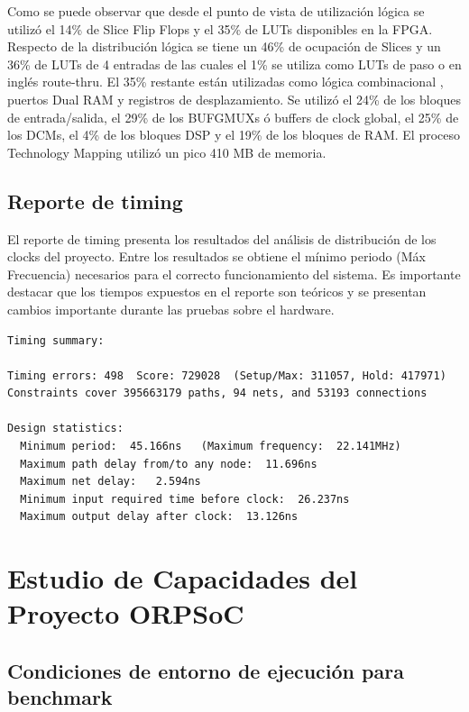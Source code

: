 	Como se puede observar que desde el punto de vista de utilización lógica se utilizó el 14\% de Slice Flip Flops y el 35\% de LUTs disponibles en
	la FPGA. Respecto de la distribución lógica se tiene un 46\% de ocupación de Slices y un 36\% de LUTs de 4 entradas de las cuales el 1\% se utiliza
	como LUTs de paso o en inglés route-thru. El 35\% restante están utilizadas como lógica combinacional , puertos Dual RAM y registros de
	desplazamiento. Se utilizó el 24\% de los bloques de entrada/salida, el 29\% de los BUFGMUXs ó buffers de clock global, el 25\% de los DCMs, el 4\%
	de los bloques DSP y el 19\% de los bloques de RAM. El proceso Technology Mapping utilizó un pico 410 MB de memoria.  

		\subsection{Reporte de timing}	

El reporte de timing presenta los resultados del análisis de distribución de los clocks del proyecto. Entre los resultados se obtiene el mínimo
periodo (Máx Frecuencia) necesarios para el correcto funcionamiento del sistema. Es importante destacar que los tiempos expuestos en el reporte son
teóricos y se presentan cambios importante durante las pruebas sobre el hardware. 

\begin{lstlisting}[frame=single,caption={Reporte timing - ORPSoC},label={lst:salidas},breaklines]
Timing summary:

Timing errors: 498  Score: 729028  (Setup/Max: 311057, Hold: 417971)
Constraints cover 395663179 paths, 94 nets, and 53193 connections

Design statistics:
  Minimum period:  45.166ns   (Maximum frequency:  22.141MHz)
  Maximum path delay from/to any node:  11.696ns
  Maximum net delay:   2.594ns
  Minimum input required time before clock:  26.237ns
  Maximum output delay after clock:  13.126ns
\end{lstlisting}

		
\section {Estudio de Capacidades del Proyecto ORPSoC}	
		\subsection{Condiciones de entorno de ejecución para benchmark}
		

